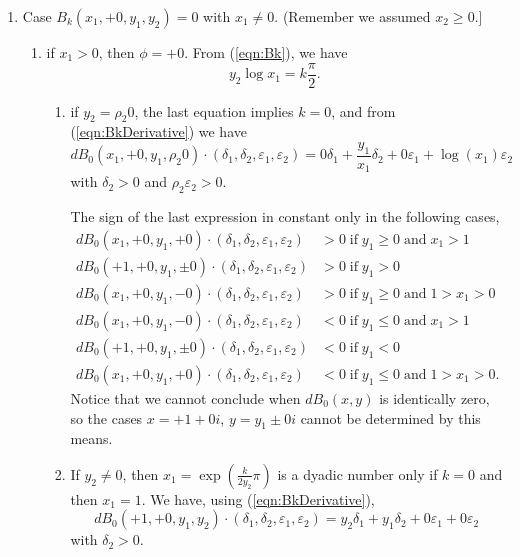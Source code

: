 \documentclass [11pt]{article}
\renewcommand {\epsilon}{\varepsilon}
\renewcommand {\leq}{\leqslant}
\renewcommand {\geq}{\geqslant}
\begin{document}
\begin {enumerate}
\begin {enumerate}
    Here, $\delta_2$ can take negative and positive values preventing the sign
    of $dB_k(\sigma_1 0, +1, k, y_2)\cdot (\delta_1, \delta_2, \epsilon_1,
    \epsilon_2)$ from being constant.
  \end {enumerate}

\item Case $B_k(x_1, +0, y_1, y_2)=0$ with $x_1 \neq 0$.
      (Remember we assumed $x_2 \geq 0$.]
  \begin {enumerate}
  \item if $x_1 >0$, then $\phi = +0$.
    From (\ref{eqn:Bk}), we have
    \[
    y_2 \log x_1 = k \frac{\pi}{2}.
    \]
    \begin {enumerate}
    \item if $y_2 = \rho_2 0$, the last equation implies $k = 0$, and from
      (\ref{eqn:BkDerivative}) we have
      \[
      dB_0(x_1, +0, y_1, \rho_2 0)\cdot(\delta_1, \delta_2, \epsilon_1,
      \epsilon_2) = 0 \delta_1 + \frac{y_1}{x_1} \delta_2 + 0 \epsilon_1 +
      \log(x_1) \epsilon_2
      \]
      with $\delta_2 > 0$ and $\rho_2 \epsilon_2 > 0$.

      The sign of the last expression in constant only in the following
      cases,
      \begin {align*}
        dB_0(x_1, +0, y_1, +0)\cdot(\delta_1, \delta_2, \epsilon_1,
        \epsilon_2) &> 0 \;\text{if}\; y_1 \geq 0 \;\text{and}\; x_1 > 1\\
        dB_0(+1, +0, y_1, \pm 0)\cdot(\delta_1, \delta_2, \epsilon_1,
        \epsilon_2) &> 0 \;\text{if}\; y_1 > 0\\
        dB_0(x_1, +0, y_1, -0)\cdot(\delta_1, \delta_2, \epsilon_1,
        \epsilon_2) &> 0 \;\text{if}\; y_1 \geq 0 \;\text{and}\; 1 > x_1 > 0 \\
        dB_0(x_1, +0, y_1, -0)\cdot(\delta_1, \delta_2, \epsilon_1,
        \epsilon_2) &< 0 \;\text{if}\; y_1 \leq 0 \;\text{and}\; x_1 > 1\\
        dB_0(+1, +0, y_1, \pm 0)\cdot(\delta_1, \delta_2, \epsilon_1,
        \epsilon_2) &< 0 \;\text{if}\; y_1 < 0\\
        dB_0(x_1, +0, y_1, +0)\cdot(\delta_1, \delta_2, \epsilon_1,
        \epsilon_2) &< 0 \;\text{if}\; y_1 \leq 0 \;\text{and}\; 1 > x_1 > 0.
      \end {align*}
      Notice that we cannot conclude when $dB_0(x,y)$ is identically zero,
      so the cases $x=+1+0i$, $y=y_1 \pm0i$ cannot be determined by this
      means.

    \item If $y_2 \neq 0$, then $x_1 = \exp\left(\frac{k}{2y_2}\pi\right)$
      is a dyadic number only if $k=0$ and then $x_1=1$.
      We have, using (\ref{eqn:BkDerivative}),
      \[
      dB_0(+1, +0, y_1, y_2)\cdot(\delta_1, \delta_2, \epsilon_1,
      \epsilon_2) = y_2 \delta_1 + y_1 \delta_2 + 0 \epsilon_1 + 0
      \epsilon_2
      \]
      with $\delta_2 > 0$.


\end{enumerate}
\end{enumerate}
\end{enumerate}
\end{document}
